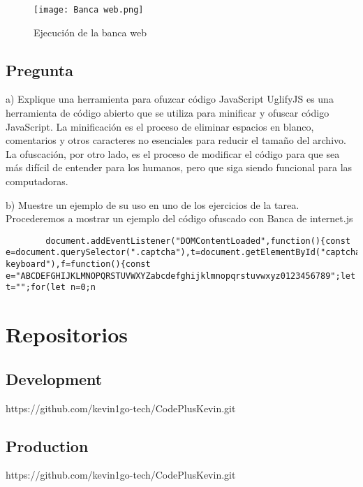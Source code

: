 \documentclass[14pt]{article}
\begin{document}
    \begin{figure}[H]
    \centering
    \texttt{[image: Banca web.png]}
    \caption{Ejecución de la banca web} %
    \label{fig:imagen} 
    \end{figure}

    \subsection{Pregunta}
    a) Explique una herramienta para ofuzcar código JavaScript
    UglifyJS es una herramienta de código abierto que se utiliza para minificar y ofuscar código JavaScript. La minificación es el proceso de eliminar espacios en blanco, comentarios y otros caracteres no esenciales para reducir el tamaño del archivo. La ofuscación, por otro lado, es el proceso de modificar el código para que sea más difícil de entender para los humanos, pero que siga siendo funcional para las computadoras.

    b) Muestre un ejemplo de su uso en uno de los ejercicios de la tarea.
    Procederemos a mostrar un ejemplo del código ofuscado con Banca de internet.js
    \begin{lstlisting}
        document.addEventListener("DOMContentLoaded",function(){const e=document.querySelector(".captcha"),t=document.getElementById("captchaInput"),n=document.getElementById("captchaRefreshButton"),o=document.getElementById("submitButton"),r=document.getElementById("successModal"),d=document.getElementById("reloadButton"),a=document.getElementById("cardType"),c=document.getElementById("cardNumber"),l=document.getElementById("documentType"),u=document.getElementById("documentNumber"),s=document.getElementById("internetKey"),i=document.querySelector(".virtual-keyboard"),f=function(){const e="ABCDEFGHIJKLMNOPQRSTUVWXYZabcdefghijklmnopqrstuvwxyz0123456789";let t="";for(let n=0;n
    \end{lstlisting}
    \section{Repositorios}
    \subsection{Development}
    https://github.com/kevin1go-tech/CodePlusKevin.git
    \subsection{Production}
    https://github.com/kevin1go-tech/CodePlusKevin.git
 
\end{document}
